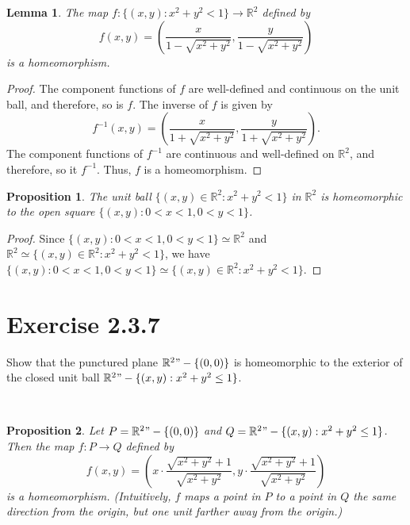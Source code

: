 \documentclass[12pt]{article}
\newtheorem{lemma}{Lemma}
\newtheorem{proposition}{Proposition}
\newenvironment{problem}
    {\begin{lrbox}{\mybox}\begin{minipage}{\textwidth-10pt}}
    {\end{minipage}\end{lrbox}\framebox[6.5in]{\usebox{\mybox}}\\}
\newcommand{\R}{\mathbb{R}}
\begin{document}
\begin{lemma}
    The map $f:\{(x,y) : x^2+y^2 < 1\} \to \R^2$ defined by
    \[f(x,y) = \left(\frac{x}{1-\sqrt{x^2+y^2}}, \frac{y}{1-\sqrt{x^2+y^2}}\right)\]
    is a homeomorphism.
\end{lemma}

\begin{proof}
    The component functions of $f$ are well-defined and continuous on the unit ball, and therefore, so is $f$. The inverse of $f$ is given by
    \[f^{-1}(x,y) = \left(\frac{x}{1+\sqrt{x^2+y^2}}, \frac{y}{1+\sqrt{x^2+y^2}}\right).\]
    The component functions of $f^{-1}$ are continuous and well-defined on $\R^2$, and therefore, so it $f^{-1}$. Thus, $f$ is a homeomorphism.
    
\end{proof}

\begin{proposition}
    The unit ball $\{(x,y)\in\R^2 : x^2+y^2 < 1\}$ in $\R^2$ is homeomorphic to the open square $\{(x,y) : 0<x<1, 0<y<1\}$.
\end{proposition}

\begin{proof}
    Since $\{(x,y) : 0<x<1, 0<y<1\}\simeq \R^2$ and $\R^2\simeq\{(x,y)\in\R^2 : x^2+y^2 < 1\}$, we have $\{(x,y) : 0<x<1, 0<y<1\}\simeq \{(x,y)\in\R^2 : x^2+y^2 < 1\}$.
\end{proof}

\section*{Exercise 2.3.7}
\begin{problem}
    Show that the punctured plane $\R^2"-\{(0,0)\}$ is homeomorphic to the exterior of the closed unit ball $\R^2"-\{(x,y) : x^2 + y^2 \leq 1\}$.
\end{problem}

\begin{proposition}
    Let $P=\R^2"-\{(0,0)\}$ and $Q=\R^2"-\{(x,y) : x^2 + y^2 \leq 1\}$. Then the map $f:P\to Q$ defined by
    \[f(x,y) = \left(x\cdot\frac{\sqrt{x^2+y^2}+1}{\sqrt{x^2+y^2}}, y\cdot \frac{\sqrt{x^2+y^2}+1}{\sqrt{x^2+y^2}}\right)\]
    is a homeomorphism. (Intuitively, $f$ maps a point in $P$ to a point in $Q$ the same direction from the origin, but one unit farther away from the origin.)
\end{proposition}
\end{document}
